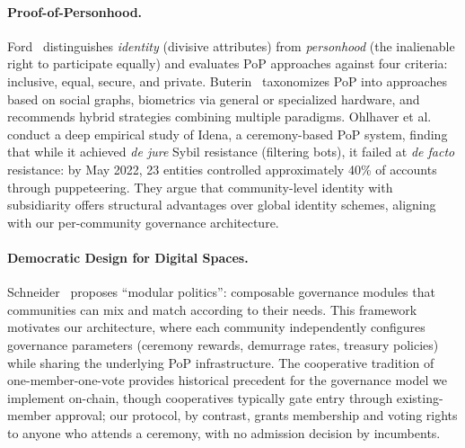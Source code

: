 \documentclass{svproc}
\begin{document}
\paragraph{Proof-of-Personhood.}
Ford~\cite{ford2020identity} distinguishes \emph{identity} (divisive attributes) from \emph{personhood} (the inalienable right to participate equally) and evaluates PoP approaches against four criteria: inclusive, equal, secure, and private. Buterin~\cite{buterin2023biometric} taxonomizes PoP into approaches based on social graphs, biometrics via general or specialized hardware, and recommends hybrid strategies combining multiple paradigms. Ohlhaver et al.~\cite{ohlhaver2024proof} conduct a deep empirical study of Idena, a ceremony-based PoP system, finding that while it achieved \emph{de jure} Sybil resistance (filtering bots), it failed at \emph{de facto} resistance: by May 2022, 23 entities controlled approximately 40\% of accounts through puppeteering. They argue that community-level identity with subsidiarity offers structural advantages over global identity schemes, aligning with our per-community governance architecture.


\paragraph{Democratic Design for Digital Spaces.}
Schneider~\cite{schneider2024governable} proposes ``modular politics'': composable governance modules that communities can mix and match according to their needs. This framework motivates our architecture, where each community independently configures governance parameters (ceremony rewards, demurrage rates, treasury policies) while sharing the underlying PoP infrastructure. The cooperative tradition of one-member-one-vote provides historical precedent for the governance model we implement on-chain, though cooperatives typically gate entry through existing-member approval; our protocol, by contrast, grants membership and voting rights to anyone who attends a ceremony, with no admission decision by incumbents.
\end{document}
